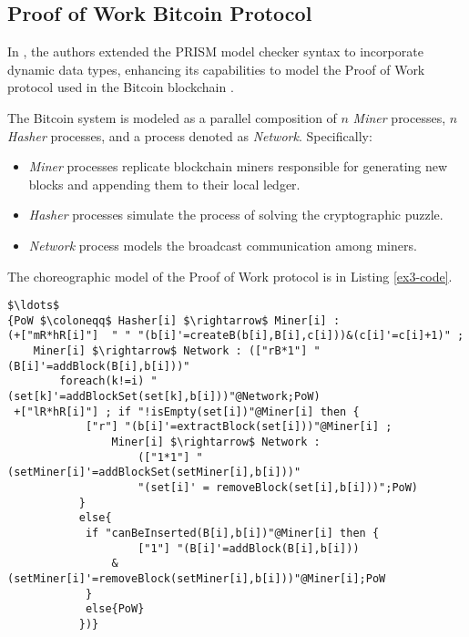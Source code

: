 \subsection{Proof of Work Bitcoin Protocol}
\begin{comment}
\begin{wrapfigure}[11]{r}{4cm}
	\texttt{[image: bitcoin.pdf]}	
\end{wrapfigure} 
\end{comment}
In \cite{DBLP:journals/concurrency/BistarelliNGLMV23}, the authors extended the PRISM model checker syntax to incorporate dynamic data types, enhancing its capabilities to model the Proof of Work protocol used in the Bitcoin blockchain \cite{bitcoin}. 

The Bitcoin system is modeled as a parallel composition of $n$ \emph{Miner} processes, $n$ \emph{Hasher} processes, and a process denoted as \emph{Network}. Specifically:
\begin{itemize}
\item \emph{Miner} processes replicate blockchain miners responsible for generating new blocks and appending them to their local ledger.
\item \emph{Hasher} processes simulate the process of solving the cryptographic puzzle.
\item \emph{Network} process models the broadcast communication among miners.
\end{itemize}
The choreographic model of the Proof of Work protocol is in Listing \ref{ex3-code}.
\begin{lstlisting}[style=chor-color,breaklines=true, postbreak=\mbox{\textcolor{red}{$\hookrightarrow$}\space},caption={Choreographic language for the Proof of Work Bitcoin Protocol},captionpos=b,label={ex3-code}]
$\ldots$
{PoW $\coloneqq$ Hasher[i] $\rightarrow$ Miner[i] :
(+["mR*hR[i]"]  " " "(b[i]'=createB(b[i],B[i],c[i]))&(c[i]'=c[i]+1)" ; 
	Miner[i] $\rightarrow$ Network : (["rB*1"] "(B[i]'=addBlock(B[i],b[i]))"   
		foreach(k!=i) "(set[k]'=addBlockSet(set[k],b[i]))"@Network;PoW)
 +["lR*hR[i]"] ; if "!isEmpty(set[i])"@Miner[i] then { 
  	   		["r"] "(b[i]'=extractBlock(set[i]))"@Miner[i] ;  
				Miner[i] $\rightarrow$ Network : 
					(["1*1"] "(setMiner[i]'=addBlockSet(setMiner[i],b[i]))"
		 			"(set[i]' = removeBlock(set[i],b[i]))";PoW) 
 		   }
 		   else{
 	   		if "canBeInserted(B[i],b[i])"@Miner[i] then { 
 	      			["1"] "(B[i]'=addBlock(B[i],b[i]))
				&(setMiner[i]'=removeBlock(setMiner[i],b[i]))"@Miner[i];PoW 
 	   		}
	   		else{PoW}
		   })} 
\end{lstlisting}
